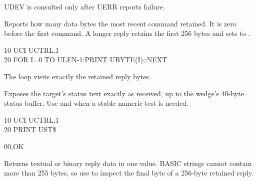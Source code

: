 \begin{referencechapter}
\begin{resultbox}
UDEV is consulted only after UERR reports failure.
\end{resultbox}




Reports how many data bytes the most recent  command retained. It is
zero before the first command. A longer reply retains the first 256 bytes and
sets  to .

\begin{screen}
10 UCI UCTRL,1\\
20 FOR I=0 TO ULEN-1:PRINT UBYTE(I);:NEXT
\end{screen}

\begin{resultbox}
The loop visits exactly the retained reply bytes.
\end{resultbox}




Exposes the target's status text exactly as received, up to the wedge's
40-byte status buffer. Use  and  when a stable numeric test
is needed.

\begin{screen}
10 UCI UCTRL,1\\
20 PRINT UST\$
\end{screen}

\begin{outputbox}
00,OK
\end{outputbox}




Returns textual or binary reply data in one value. BASIC strings cannot contain
more than 255 bytes, so use  to inspect the final byte of a
256-byte retained reply.


\end{referencechapter}
